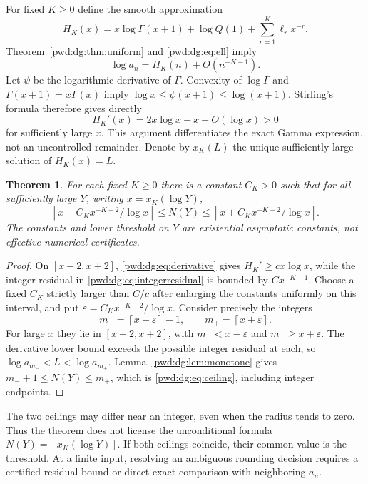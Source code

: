\documentclass[11pt,letterpaper]{article}
\numberwithin{equation}{section}
\newtheorem{theorem}{Theorem}[section]
\theoremstyle{remark}\newtheorem{remark}[theorem]{Remark}
\newcommand{\ceil}[1]{\left\lceil #1\right\rceil}
\newcommand{\eps}{\varepsilon}
\begin{document}
For fixed $K\ge0$ define the smooth approximation
\begin{equation}\label{pwd:dg:eq:HK}
 H_K(x)=x\log\Gamma(x+1)+\log Q(1)+\sum_{r=1}^K\ell_rx^{-r}.
\end{equation}
Theorem~\ref{pwd:dg:thm:uniform} and \eqref{pwd:dg:eq:ell} imply
\begin{equation}\label{pwd:dg:eq:integerresidual}
 \log a_n=H_K(n)+O(n^{-K-1}).
\end{equation}
Let $\psi$ be the logarithmic derivative of $\Gamma$. Convexity of $\log\Gamma$ and $\Gamma(x+1)=x\Gamma(x)$ imply $\log x\le\psi(x+1)\le\log(x+1)$. Stirling's formula \cite{dlmfgamma} therefore gives directly
\begin{equation}\label{pwd:dg:eq:derivative}
 H_K'(x)=2x\log x-x+O(\log x)>0
\end{equation}
for sufficiently large $x$. This argument differentiates the exact Gamma expression, not an uncontrolled remainder. Denote by $x_K(L)$ the unique sufficiently large solution of $H_K(x)=L$.

\begin{theorem}\label{pwd:dg:thm:ceil}
For each fixed $K\ge0$ there is a constant $C_K>0$ such that for all sufficiently large $Y$, writing $x=x_K(\log Y)$,
\begin{equation}\label{pwd:dg:eq:ceiling}
 \ceil{x-C_Kx^{-K-2}/\log x}\le N(Y)
 \le\ceil{x+C_Kx^{-K-2}/\log x}.
\end{equation}
The constants and lower threshold on $Y$ are existential asymptotic constants, not effective numerical certificates.
\end{theorem}
\begin{proof}
On $[x-2,x+2]$, \eqref{pwd:dg:eq:derivative} gives $H_K'\ge c x\log x$, while the integer residual in \eqref{pwd:dg:eq:integerresidual} is bounded by $C x^{-K-1}$. Choose a fixed $C_K$ strictly larger than $C/c$ after enlarging the constants uniformly on this interval, and put $\eps=C_Kx^{-K-2}/\log x$. Consider precisely the integers
\[
 m_- =\ceil{x-\eps}-1,\qquad m_+=\ceil{x+\eps}.
\]
For large $x$ they lie in $[x-2,x+2]$, with $m_-<x-\eps$ and $m_+\ge x+\eps$. The derivative lower bound exceeds the possible integer residual at each, so $\log a_{m_-}<L<\log a_{m_+}$. Lemma~\ref{pwd:dg:lem:monotone} gives $m_-+1\le N(Y)\le m_+$, which is \eqref{pwd:dg:eq:ceiling}, including integer endpoints.
\end{proof}

The two ceilings may differ near an integer, even when the radius tends to zero. Thus the theorem does not license the unconditional formula $N(Y)=\ceil{x_K(\log Y)}$. If both ceilings coincide, their common value is the threshold. At a finite input, resolving an ambiguous rounding decision requires a certified residual bound or direct exact comparison with neighboring $a_n$.
\end{document}
